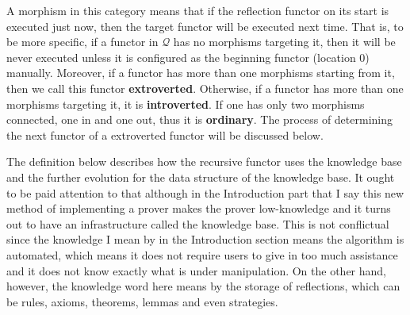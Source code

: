 \documentclass[preprint]{elsarticle}
\numberwithin{theorem}{section}	%
\numberwithin{axiom}{section}	%
\numberwithin{definition}{section}	%
\begin{document}
\begin{definition}
A morphism in this category means that if the reflection functor on its start is executed just now, then the target functor will be executed next time. That is, to be more specific, if a functor in \(\mathcal{Q}\) has no morphisms targeting it, then it will be never executed unless it is configured as the beginning functor (location \(0\)) manually. Moreover, if a functor has more than one morphisms starting from it, then we call this functor \textbf{ extroverted}. Otherwise, if a functor has more than one morphisms targeting it, it is \textbf{ introverted}. If one has only two morphisms connected, one in and one out, thus it is\textbf{  ordinary}. The process of determining the next functor of a extroverted functor will be discussed below.
\end{definition}

The definition below describes how the recursive functor uses the knowledge base and the further evolution for the data structure of the knowledge base. It ought to be paid attention to that although in the Introduction part that I say this new method of implementing a prover makes the prover low-knowledge and it turns out to have an infrastructure called the knowledge base. This is not conflictual since the knowledge I mean by in the Introduction section means the algorithm is automated, which means it does not require users to give in too much assistance and it does not know exactly what is under manipulation. On the other hand, however, the knowledge word here means by the storage of reflections, which can be rules, axioms, theorems, lemmas and even strategies.
\end{document}

